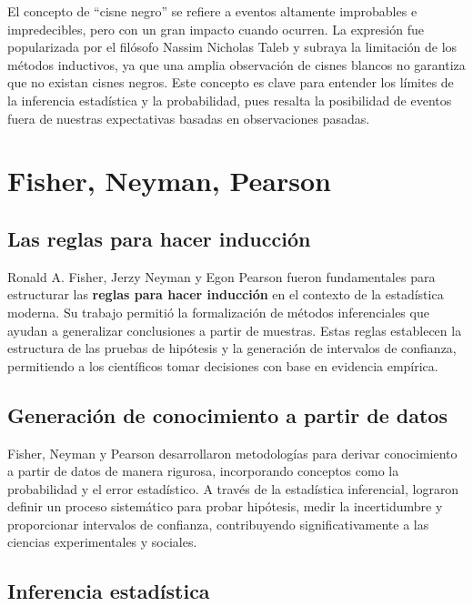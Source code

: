 \documentclass[
  letterpaper,
  DIV=11,
  numbers=noendperiod]{scrreprt}
\begin{document}
El concepto de ``cisne negro'' se refiere a eventos altamente
improbables e impredecibles, pero con un gran impacto cuando ocurren. La
expresión fue popularizada por el filósofo Nassim Nicholas Taleb y
subraya la limitación de los métodos inductivos, ya que una amplia
observación de cisnes blancos no garantiza que no existan cisnes negros.
Este concepto es clave para entender los límites de la inferencia
estadística y la probabilidad, pues resalta la posibilidad de eventos
fuera de nuestras expectativas basadas en observaciones pasadas.

\chapter{Fisher, Neyman, Pearson}\label{fisher-neyman-pearson}

\section{Las reglas para hacer
inducción}\label{las-reglas-para-hacer-inducciuxf3n}

Ronald A. Fisher, Jerzy Neyman y Egon Pearson fueron fundamentales para
estructurar las \textbf{reglas para hacer inducción} en el contexto de
la estadística moderna. Su trabajo permitió la formalización de métodos
inferenciales que ayudan a generalizar conclusiones a partir de
muestras. Estas reglas establecen la estructura de las pruebas de
hipótesis y la generación de intervalos de confianza, permitiendo a los
científicos tomar decisiones con base en evidencia empírica.

\section{Generación de conocimiento a partir de
datos}\label{generaciuxf3n-de-conocimiento-a-partir-de-datos}

Fisher, Neyman y Pearson desarrollaron metodologías para derivar
conocimiento a partir de datos de manera rigurosa, incorporando
conceptos como la probabilidad y el error estadístico. A través de la
estadística inferencial, lograron definir un proceso sistemático para
probar hipótesis, medir la incertidumbre y proporcionar intervalos de
confianza, contribuyendo significativamente a las ciencias
experimentales y sociales.

\section{Inferencia estadística}\label{inferencia-estaduxedstica}
\end{document}

